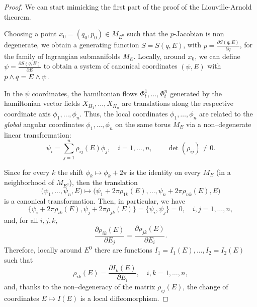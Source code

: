 \documentclass[english,fontsize=11pt,paper=a5,oneside]{scrbook}
\let\d\relax
\DeclareMathOperator{\d}{d}
\theoremstyle{definition}
\begin{document}
\begin{proof}
    We can start mimicking the first part of the proof of the Liouville-Arnold theorem. %
    
    Choosing a point $x_0 = (q_0, p_0) \in M_{E^0}$ such that the $p$-Jacobian is non degenerate, we obtain a generating function $S=S(q,E)$, with $p = \frac{\partial S(q,E)}{\partial q}$, for the family of lagrangian submanifolds $M_E$.
    Locally, around $x_0$, we can define $\psi = \frac{\partial S(q,E)}{\partial E}$ to obtain a system of canonical coordinates $(\psi, E)$ with $\d p\wedge\d q = \d E\wedge \d \psi$.

    In the $\psi$ coordinates, the hamiltonian flows $\Phi_t^1, \ldots, \Phi_t^n$ generated by the hamiltonian vector fields $X_{H_1}, \ldots, X_{H_n}$ are translations along the respective coordinate axis $\phi_1, \ldots, \phi_n$.
    Thus, the local coordinates $\phi_1, \ldots, \phi_n$ are related to the \emph{global} angular coordinates $\phi_1, \ldots, \phi_n$ on the same torus $M_E$ via a non--degenerate linear transformation:
    \begin{equation}
        \psi_i = \sum_{j=1}^n \rho_{ij}(E)\phi_j, \quad i=1,\ldots,n, \qquad \det(\rho_{ij})\neq 0.
    \end{equation}

    Since for every $k$ the shift $\phi_k \mapsto \phi_k + 2\pi$ is the identity on every $M_E$ (in a neighborhood of $M_{E^0}$), then the translation
    \begin{equation}
        \big(\psi_1, \ldots, \psi_n, E\big) \mapsto \big(\psi_1 + 2\pi \rho_{1k}(E), \ldots, \psi_n + 2\pi \rho_{nk}(E), E\big)
    \end{equation}
    is a canonical transformation.
    Then, in particular, we have
    \begin{equation}
        \big\{
            \psi_i + 2\pi \rho_{ik}(E), \psi_j + 2\pi \rho_{jk}(E)
        \big\} = \big\{\psi_i, \psi_j\big\} = 0, \quad i,j = 1, \ldots, n,
    \end{equation}
    and, for all $i,j,k$,
    \begin{equation}
        \frac{\partial \rho_{ik}(E)}{\partial E_j} 
        = \frac{\partial \rho_{jk}(E)}{\partial E_i}.
    \end{equation}
    Therefore, locally around $E^0$ there are functions $I_1 = I_1(E), \ldots, I_2 = I_2(E)$ such that
    \begin{equation}
        \rho_{ik}(E) = \frac{\partial I_k(E)}{\partial E_i}, \quad i,k=1,\ldots,n,
    \end{equation}
    and, thanks to the non--degeneracy of the matrix $\rho_{ij}(E)$, the change of coordinates $E \mapsto I(E)$ is a local diffeomorphism.


\end{proof}
\end{document}

